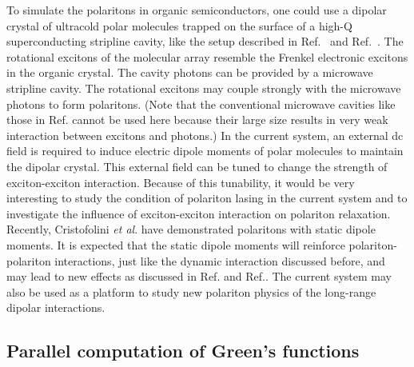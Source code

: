 To simulate the polaritons in organic semiconductors, one could use a dipolar crystal of ultracold polar molecules 
 trapped on the surface of a high-Q superconducting stripline cavity, like the setup described in 
Ref.~\cite{peter-rabl} and Ref.~\cite{peter-rabl2}.
The rotational excitons of the molecular array resemble the Frenkel electronic excitons in the 
 organic crystal. The cavity photons can be provided by a microwave stripline cavity. 
The rotational excitons may couple strongly with the microwave photons to form polaritons. 
(Note that the conventional 
microwave cavities like those in Ref. \cite{raimond2001} cannot be used here because their large size results in very 
weak interaction between excitons and photons.) 
In the current system,  an external dc field is required to induce electric dipole moments of polar molecules to 
maintain the dipolar crystal. This external field can be tuned to change the strength
of exciton-exciton interaction. Because of this tunability, it would be very interesting to study the condition of 
polariton lasing in the current system and to investigate the influence of exciton-exciton interaction 
 on polariton relaxation. 
Recently, Cristofolini \textit{et al}. have demonstrated polaritons with static dipole moments\cite{cristofolini2012}. 
It is expected that the static dipole moments will reinforce polariton-polariton interactions, just like the dynamic 
interaction discussed before, and may lead to new effects as discussed in Ref.\cite{astrakharchik2007} and 
Ref.\cite{boning2011}.  The current system may also be used as a platform to study new polariton physics of
the long-range dipolar interactions. 
  


\subsection{Parallel computation of Green's functions}

